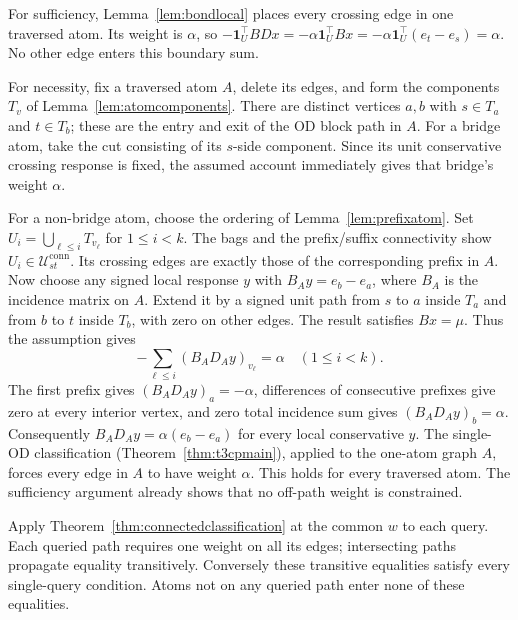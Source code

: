 \begin{pf}
For sufficiency, Lemma~\ref{lem:bondlocal} places every crossing edge
in one traversed atom. Its weight is $\alpha$, so
$-\mathbf1_U^\top BDx=-\alpha\mathbf1_U^\top Bx
=-\alpha\mathbf1_U^\top(e_t-e_s)=\alpha$.
No other edge enters this boundary sum.

For necessity, fix a traversed atom $A$, delete its edges, and form
the components $T_v$ of Lemma~\ref{lem:atomcomponents}. There are
distinct vertices $a,b$ with $s\in T_a$ and $t\in T_b$; these are the
entry and exit of the OD block path in $A$.
For a bridge atom, take the cut consisting of its $s$-side component.
Since its unit conservative crossing response is fixed, the assumed
account immediately gives that bridge's weight $\alpha$.

For a non-bridge atom, choose the ordering of
Lemma~\ref{lem:prefixatom}. Set
$U_i=\bigcup_{\ell\le i}T_{v_\ell}$ for $1\le i<k$.
The bags and the prefix/suffix connectivity show
$U_i\in\mathcal U^{\mathrm{conn}}_{st}$. Its crossing edges are exactly
those of the corresponding prefix in $A$.
Now choose any signed local response $y$ with
$B_Ay=e_b-e_a$, where $B_A$ is the incidence matrix on $A$.
Extend it by a signed unit path from $s$ to $a$ inside $T_a$ and from
$b$ to $t$ inside $T_b$, with zero on other edges. The result satisfies
$Bx=\mu$. Thus the assumption gives
\[
-\sum_{\ell\le i}(B_AD_Ay)_{v_\ell}=\alpha
\quad(1\le i<k).
\]
The first prefix gives $(B_AD_Ay)_a=-\alpha$, differences of consecutive
prefixes give zero at every interior vertex, and zero total incidence
sum gives $(B_AD_Ay)_b=\alpha$. Consequently
$B_AD_Ay=\alpha(e_b-e_a)$ for every local conservative $y$.
The single-OD classification (Theorem~\ref{thm:t3cpmain}), applied to the
one-atom graph $A$, forces every edge in $A$ to have weight $\alpha$.
This holds for every traversed atom. The sufficiency argument already
shows that no off-path weight is constrained.
\end{pf}

\begin{pf}
Apply Theorem~\ref{thm:connectedclassification} at the common $w$ to
each query. Each queried path requires one weight on all its edges;
intersecting paths propagate equality transitively. Conversely these
transitive equalities satisfy every single-query condition. Atoms not
on any queried path enter none of these equalities.
\end{pf}

